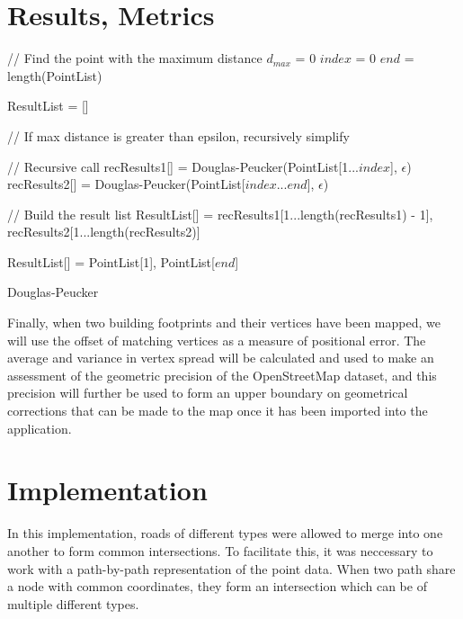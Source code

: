 \documentclass[a4paper]{article}
\begin{document}
\section{Results, Metrics}



\begin{algorithm}[H]
\SetAlgoLined
{}
    // Find the point with the maximum distance\;
    $d_{max}$ = 0\;
    $index$ = 0\;
    $end$ = length(PointList)\;
    

    ResultList = []\;
    
    // If max distance is greater than epsilon, recursively simplify\;
     {
        // Recursive call\;
        recResults1[] = Douglas-Peucker(PointList[1...$index$], $\epsilon$)\;
        recResults2[] = Douglas-Peucker(PointList[$index$...$end$], $\epsilon$)\;

        // Build the result list\;
        ResultList[] = {recResults1[1...length(recResults1) - 1], recResults2[1...length(recResults2)]}\;
    }{
        ResultList[] = {PointList[1], PointList[$end$]}\;
    }
    \;

    \caption{Douglas-Peucker}
\end{algorithm}

Finally, when two building footprints and their vertices have been mapped, we will use the offset of matching vertices as a measure of positional error. The average and variance in vertex spread will be calculated and used to make an assessment of the geometric precision of the OpenStreetMap dataset, and this precision will further be used to form an upper boundary on geometrical corrections that can be made to the map once it has been imported into the application.

\section{Implementation}

In this implementation, roads of different types were allowed to merge into one another to form common intersections. To facilitate this, it was neccessary to work with a path-by-path representation of the point data. When two path share a node with common coordinates, they form an intersection which can be of multiple different types.
\end{document}
